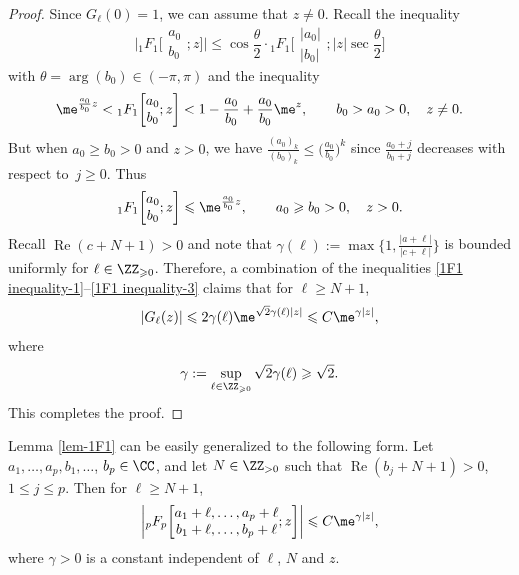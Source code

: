 \begin{proof}
	Since $G_{\ell}(0)=1$, we can assume that $z\ne 0$. Recall the inequality \cite[equation~(2.3)]{Joshi_Arya-1982}
	\begin{equation}\label{1F1 inequality-1}
		\biggl|{}_1F_1\bigg[\begin{matrix}
			a_0\\
			b_0
		\end{matrix};z\bigg]\biggr|\leqslant \cos\frac{\theta}{2}\cdot
		{}_1F_1\biggl[\begin{matrix}
			|a_0|\\
			|b_0|
		\end{matrix};|z|\sec\frac{\theta}{2}\bigg]
	\end{equation}
	with $\theta=\arg(b_0)\in (-\pi,\pi)$ and the inequality \cite[p. 37, equation~(3.5)]{Carlson-1966}
	\begin{equation}\label{1F1 inequality-2}
		\me^{\frac{a_0}{b_0}z}<{}_1F_1\biggl[\begin{matrix}
			a_0\\
			b_0
		\end{matrix};z\biggr]<1-\frac{a_0}{b_0}+\frac{a_0}{b_0}\me^z,\qquad b_0>a_0>0,\quad z\ne 0.
	\end{equation}
	But when $a_0\geqslant b_0>0$ and $z>0$, we have $\frac{(a_0)_k}{(b_0)_k}\leqslant \big(\frac{a_0}{b_0}\big)^k$ since $\frac{a_0+j}{b_0+j}$ decreases with respect to~${j\geqslant 0}$. Thus
	\begin{equation}\label{1F1 inequality-3}
		{}_1F_1\biggl[\begin{matrix}
			a_0\\
			b_0
		\end{matrix};z\biggr]\leqslant\me^{\frac{a_0}{b_0}z},\qquad a_0\geqslant b_0>0,\quad z>0.
	\end{equation}
	Recall $\operatorname{Re}(c+N+1)>0$ and note that $\gamma(\ell):=\max\bigl\{1,\frac{|a+\ell|}{|c+\ell|}\bigr\}$ is bounded uniformly for $\ell\in\ZZ_{\geqslant 0}$. Therefore, a combination of the inequalities \eqref{1F1 inequality-1}--\eqref{1F1 inequality-3} claims that for $\ell\geqslant N+1$,
	\[|G_\ell(z)|\leqslant 2\gamma(\ell)\me^{\sqrt{2}\gamma(\ell)|z|}\leqslant C\me^{\gamma|z|},\]
	where
	\[\gamma:=\sup_{\ell\in\ZZ_{\geqslant 0}}\sqrt{2}\gamma(\ell)\geqslant \sqrt{2}.\]
	This completes the proof.
\end{proof}

\begin{Remark}
	Lemma \ref{lem-1F1} can be easily generalized to the following form. Let $a_1,\dots,a_p,b_1,\dots$, $b_p\in\CC$, and let $N\in\ZZ_{>0}$ such that $\operatorname{Re}(b_j+N+1)>0$, $1\leqslant j\leqslant p$. Then for $\ell\geqslant N+1$,
		\begin{equation}\label{pFp estimate}
			\biggl|{}_pF_p\biggl[\begin{matrix}
				a_1+\ell,\dots,a_p+\ell\\
				b_1+\ell,\dots,b_p+\ell
			\end{matrix};z\biggr]\biggr|\leqslant C\me^{\gamma|z|},
		\end{equation}
		where $\gamma>0$ is a constant independent of $\ell$, $N$ and $z$.
\end{Remark}
